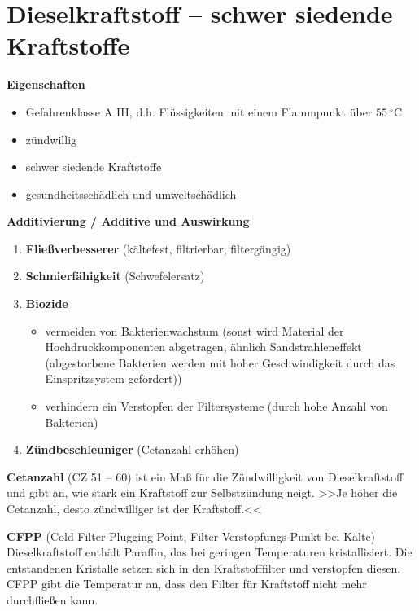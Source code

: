 \section{Dieselkraftstoff -- schwer siedende
Kraftstoffe}\label{dieselkraftstoff-schwer-siedende-kraftstoffe}

\textbf{Eigenschaften}

\begin{itemize}
\item
  Gefahrenklasse A III, d.h. Flüssigkeiten mit einem Flammpunkt über
  $55~^\circ\text{C}$
\item
  zündwillig
\item
  schwer siedende Kraftstoffe
\item
  gesundheitsschädlich und umweltschädlich
\end{itemize}

\textbf{Additivierung / Additive und Auswirkung}

\begin{enumerate}
\item
  \textbf{Fließverbesserer} (kältefest, filtrierbar, filtergängig)
\item
  \textbf{Schmierfähigkeit} (Schwefelersatz)
\item
  \textbf{Biozide}

  \begin{itemize}
  \item
    vermeiden von Bakterienwachstum (sonst wird Material der
    Hochdruckkomponenten abgetragen, ähnlich Sandstrahleneffekt
    (abgestorbene Bakterien werden mit hoher Geschwindigkeit durch das
    Einspritzsystem gefördert))
  \item
    verhindern ein Verstopfen der Filtersysteme (durch hohe Anzahl von
    Bakterien)
  \end{itemize}
\item
  \textbf{Zündbeschleuniger} (Cetanzahl erhöhen)
\end{enumerate}

\textbf{Cetanzahl} (CZ 51 -- 60) ist ein Maß für die Zündwilligkeit von
Dieselkraftstoff und gibt an, wie stark ein Kraftstoff zur Selbstzündung
neigt. >>Je höher die Cetanzahl, desto zündwilliger ist der
Kraftstoff.<<

\textbf{CFPP} (Cold Filter Plugging Point, Filter-Verstopfungs-Punkt bei
Kälte) Dieselkraftstoff enthält Paraffin, das bei geringen Temperaturen
kristallisiert. Die entstandenen Kristalle setzen sich in den
Kraftstofffilter und verstopfen diesen. CFPP gibt die Temperatur an,
dass den Filter für Kraftstoff nicht mehr durchfließen kann.

